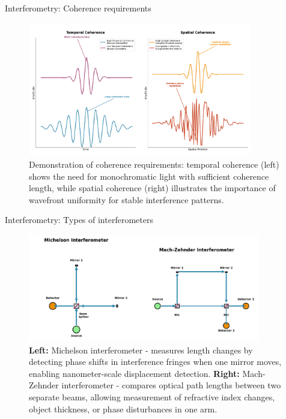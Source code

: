 \documentclass{beamer}
\begin{document}
\begin{frame}{Interferometry: Coherence requirements}
    
    \begin{figure}[h]
        \centering
        \includegraphics[width=0.87\textwidth]{Figures/temporal-spatial-coherence.png}
        \caption{Demonstration of coherence requirements: temporal coherence (left) shows the need for monochromatic light with sufficient coherence length, while spatial coherence (right) illustrates the importance of wavefront uniformity for stable interference patterns.}
        \label{fig:coherence}
    \end{figure}
\end{frame}
\begin{frame}{Interferometry: Types of interferometers}
    \vspace{0.2cm}
    \begin{figure}[h]
        \centering
        \includegraphics[width=0.9\textwidth]{Figures/interferometers-types.png}
        \caption{\textbf{Left:} Michelson interferometer - measures length changes by detecting phase shifts in interference fringes when one mirror moves, enabling nanometer-scale displacement detection. \textbf{Right:} Mach-Zehnder interferometer - compares optical path lengths between two separate beams, allowing measurement of refractive index changes, object thickness, or phase disturbances in one arm.}
        \label{fig:interferometers}
    \end{figure}
\end{frame}
\end{document}
